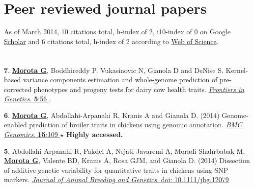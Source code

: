 \documentclass[margin,line,10pt]{res}
\newenvironment{list1}{
  \begin{list}{\ding{113}}{%
      \setlength{\itemsep}{0in}
      \setlength{\parsep}{0in} \setlength{\parskip}{0in}
      \setlength{\topsep}{0in} \setlength{\partopsep}{0in} 
      \setlength{\leftmargin}{0.17in}}}{\end{list}}
\begin{document}
\begin{resume}
\vspace{0.5cm}
\section{\sc Peer reviewed journal papers}
\vspace{.1cm}
As of March 2014, 10 citations total, h-index of 2, i10-index of 0 on \href{http://scholar.google.com/citations?user=isy-n24AAAAJ&hl=en}{Google Scholar} and 6 citations total, h-index of 2 according to \href{http://apps.webofknowledge.com/CitationReport.do?product=UA&search_mode=CitationReport&SID=2ANkOV2Yixqv6aDkdvn&page=1&cr_pqid=8&viewType=summary}{Web of Science}. 
\vspace{.1cm}

\section{}

\begin{list1}

\item [{\bf 7}.]  {\bf \underline{Morota G}}, Boddhireddy P, Vukasinovic N, Gianola D and DeNise S.  
 Kernel-based variance components estimation and  whole-genome prediction of pre-corrected phenotypes and progeny tests for dairy cow health traits.   
     \textcolor{blue}{\href{http://journal.frontiersin.org/Journal/10.3389/fgene.2014.00056/abstract}{ {\it Frontiers in Genetics}. {\bf 5}:56 }. } 
\vspace{0.5cm}

\item [{\bf 6}.]  {\bf \underline{Morota G}}, Abdollahi-Arpanahi R, Kranis A and Gianola D. (2014)   
     Genome-enabled prediction of broiler traits in chickens using genomic annotation.  
     \textcolor{blue}{\href{http://www.biomedcentral.com/1471-2164/15/109/abstract}{ {\it BMC Genomics}. {\bf 15}:109 } } 
     {\bf $\star$ Highly accessed.}

\vspace{0.5cm}

\item [{\bf 5}.]  Abdollahi-Arpanahi R, Pakdel A, Nejati-Javaremi A, Moradi-Shahrbabak M, 
     {\bf \underline{Morota G}}, Valente BD, Kranis A, Rosa GJM, and Gianola D. (2014)
     Dissection of additive genetic variability for quantitative traits in chickens using SNP markers. 
     \textcolor{blue}{\href{http://onlinelibrary.wiley.com/doi/10.1111/jbg.12079/abstract}{ {\it Journal of Animal Breeding and Genetics}. doi: 10.1111/jbg.12079} }


\end{list1}
\end{resume}
\end{document}
